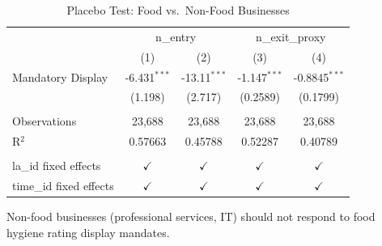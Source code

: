 
\begin{table}[htbp]
   \caption{\label{tab:placebo} Placebo Test: Food vs.\ Non-Food Businesses}
   \bigskip
   \centering
   \small
   \begin{tabular}{lcccc}
      \toprule
       & \multicolumn{2}{c}{n\_entry} & \multicolumn{2}{c}{n\_exit\_proxy}\\
                              & (1)            & (2)            & (3)            & (4)\\  
      \midrule 
      Mandatory Display       & -6.431$^{***}$ & -13.11$^{***}$ & -1.147$^{***}$ & -0.8845$^{***}$\\   
                              & (1.198)        & (2.717)        & (0.2589)       & (0.1799)\\   
       \\
      Observations            & 23,688         & 23,688         & 23,688         & 23,688\\  
      R$^2$                   & 0.57663        & 0.45788        & 0.52287        & 0.40789\\  
       \\
      la\_id fixed effects    & $\checkmark$   & $\checkmark$   & $\checkmark$   & $\checkmark$\\   
      time\_id fixed effects  & $\checkmark$   & $\checkmark$   & $\checkmark$   & $\checkmark$\\   
      \bottomrule
   \end{tabular}
   
   \par \raggedright 
   Non-food businesses (professional services, IT) should not respond to food hygiene rating display mandates.
\end{table}


